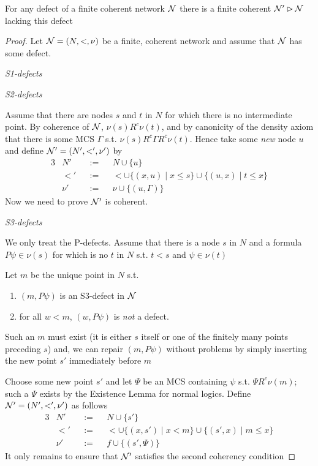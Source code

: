 \documentclass[11pt]{article}
\begin{document}
\begin{lemma}
For any defect of a finite coherent network \(\mathcal{N}\) there is a finite
coherent \(\mathcal{N}'\rhd\mathcal{N}\) lacking this defect
\end{lemma}

\begin{proof}
Let \(\mathcal{N}=(N,<,\nu)\) be a finite, coherent network and assume that \(\mathcal{N}\)
has some defect.

\emph{S1-defects}



\emph{S2-defects}

Assume that there are nodes \(s\) and \(t\) in \(N\) for which there is no
intermediate point. By coherence of \(\mathcal{N}\), \(\nu(s)R^c\nu(t)\), and by
canonicity of the density axiom that there is some MCS \(\Gamma\) s.t.
\(\nu(s)R^c\Gamma R^c\nu(t)\). Hence take some \emph{new} node \(u\) and define
\(\mathcal{N}'=(N',<',\nu')\) by
\begin{alignat*}{3}
&N'&&:=&&N\cup\{u\}\\
&<'&&:=&&<\cup\{(x,u)\mid x\le s\}\cup\{(u,x)\mid t\le x\}\\
&\nu'&&:=&&\nu\cup\{(u,\Gamma)\}
\end{alignat*}
Now we need to prove \(\mathcal{N}'\) is coherent.

\emph{S3-defects}

We only treat the P-defects. Assume that there is a node \(s\) in \(N\) and a
formula \(P\psi\in\nu(s)\)  for which is no \(t\) in \(N\) s.t. \(t<s\) and \(\psi\in\nu(t)\)

Let \(m\) be the unique point in \(N\) s.t.
\begin{enumerate}
\item \((m,P\psi)\) is an S3-defect in \(\mathcal{N}\)
\item for all \(w<m\), \((w,P\psi)\) is \emph{not} a defect.
\end{enumerate}


Such an \(m\) must exist (it is either \(s\) itself or one of the finitely
many points preceding \(s\)) and, we can repair \((m,P\psi)\) without
problems by simply inserting the new point \(s'\) immediately before \(m\)

Choose some new point \(s'\) and let \(\Psi\) be an MCS containing \(\psi\) s.t.
\(\Psi R^c \nu(m)\); such a \(\Psi\) exists by the Existence Lemma for normal logics.
Define \(\mathcal{N}'=(N',<',\nu')\) as follows
\begin{alignat*}{3}
&N'&&:=&&N\cup\{s'\}\\
&<'&&:=&&<\cup\{(x,s')\mid x<m\}\cup\{(s',x)\mid m\le x\}\\
&\nu'&&:=&&f\cup\{(s',\Psi)\}
\end{alignat*}
It only remains to ensure that \(\mathcal{N}'\) satisfies the second coherency
condition


\end{proof}
\end{document}
